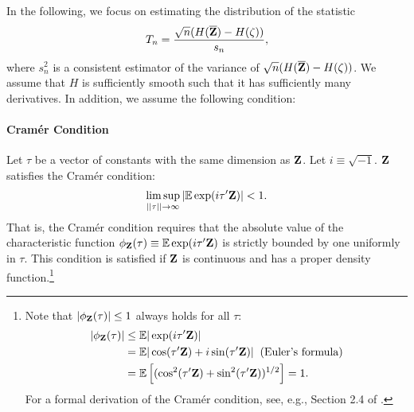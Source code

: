 \documentclass[11pt, A4paper, openany, uplatex]{book}
\begin{document}
In the following, we focus on estimating the distribution of the statistic
\begin{align*}
	T_n = \frac{\sqrt{n}(H(\overline{\mathbf{Z}}) - H(\zeta))}{s_n},
\end{align*}
where $s_n^2$ is a consistent estimator of the variance of $\sqrt{n}(H(\overline{\mathbf{Z}}) - H(\zeta))$.
We assume that $H$ is sufficiently smooth such that it has sufficiently many derivatives.
In addition, we assume the following condition:

\paragraph{Cram\'{e}r Condition} 
Let $\tau$ be a vector of constants with the same dimension as $\mathbf{Z}$.
Let $i \equiv \sqrt{-1}$.
$\mathbf{Z}$ satisfies the Cram\'{e}r condition:
\begin{align*}
	\limsup_{||\tau || \to \infty} |\mathbb{E} \exp(i \tau' \mathbf{Z})| < 1. 
\end{align*} 
That is,  the Cram\'er condition requires that the absolute value of the characteristic function $\phi_\mathbf{Z}(\tau) \equiv \mathbb{E} \exp(i \tau' \mathbf{Z})$ is strictly bounded by one uniformly in $\tau$.
This condition is satisfied if $\mathbf{Z}$ is continuous and has a proper density function.\footnote{
	Note that $|\phi_\mathbf{Z}(\tau)| \le 1$ always holds for all $\tau$:
	\begin{align*}
		|\phi_\mathbf{Z}(\tau)| 
		& \le \mathbb{E} | \exp(i \tau' \mathbf{Z})| \\
		& = \mathbb{E} |\cos(\tau' \mathbf{Z}) + i \sin (\tau' \mathbf{Z})| \;\; (\text{Euler's formula}) \\
		& = \mathbb{E}\left[  (\cos^2(\tau' \mathbf{Z}) +  \sin^2(\tau' \mathbf{Z}))^{1/2} \right] = 1.
	\end{align*}
	For a formal derivation of the Cram\'er condition, see, e.g., Section 2.4 of \cite{hall1992bootstrap}.
}
\end{document}
